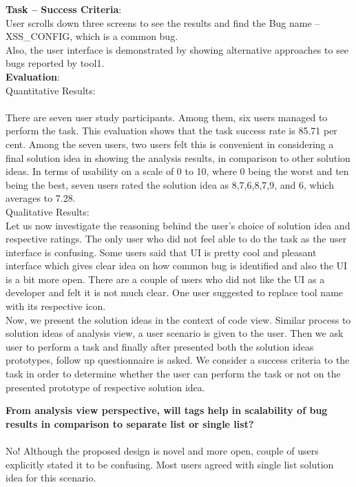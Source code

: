 \textbf{Task – Success Criteria}: \\

User scrolls down three screens to see the results and find the Bug name – XSS\_CONFIG, which is a common bug. \\

Also, the user interface is demonstrated by showing alternative approaches to see bugs reported by tool1. \\

\textbf{Evaluation}: \\

Quantitative Results: \\ \\
There are seven user study participants. Among them, six users managed to perform the task. This evaluation shows that the task success rate is 85.71 per cent. Among the seven users, two users felt this is convenient in considering a final solution idea in showing the analysis results, in comparison to other solution ideas. In terms of usability on a scale of 0 to 10, where 0 being the worst and ten being the best, seven users rated the solution idea as 8,7,6,8,7,9, and 6, which averages to 7.28. \\

Qualitative Results: \\

Let us now investigate the reasoning behind the user’s choice of solution idea and respective ratings. The only user who did not feel able to do the task as the user interface is confusing. Some users said that UI is pretty cool and pleasant interface which gives clear idea on how common bug is identified and also the UI is a bit more open. There are a couple of users who did not like the UI as a developer and felt it is not much clear. One user suggested to replace tool name with its respective icon. \\

Now, we present the solution ideas in the context of code view. Similar process to solution ideas of analysis view, a user scenario is given to the user. Then we ask user to perform a task and finally after presented both the solution ideas prototypes, follow up questionnaire is asked. We consider a success criteria to the task in order to determine whether the user can perform the task or not on the presented prototype of respective solution idea. \\

\begin{myboxi}{{\textbf{From analysis view perspective, will tags help in scalability of bug results in comparison to separate list or single list?}}}
\\ \\	No! Although the proposed design is novel and more open, couple of users explicitly stated it to be confusing. Most users agreed with single list solution idea for this scenario.
\end{myboxi}

